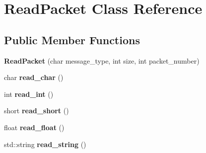 \hypertarget{class_read_packet}{\section{Read\-Packet Class Reference}
\label{class_read_packet}
}
\subsection*{Public Member Functions}
\begin{DoxyCompactItemize}
\item 
\hypertarget{class_read_packet_a00a7b6a89da284df88ca3f8ab55fae2d}{{\bfseries Read\-Packet} (char message\-\_\-type, int size, int packet\-\_\-number)}\label{class_read_packet_a00a7b6a89da284df88ca3f8ab55fae2d}

\item 
\hypertarget{class_read_packet_a63753af52ef533c66b3be50872f3abd2}{char {\bfseries read\-\_\-char} ()}\label{class_read_packet_a63753af52ef533c66b3be50872f3abd2}

\item 
\hypertarget{class_read_packet_ad8d4bb0fe52c7660db0cd089fd2e5c4a}{int {\bfseries read\-\_\-int} ()}\label{class_read_packet_ad8d4bb0fe52c7660db0cd089fd2e5c4a}

\item 
\hypertarget{class_read_packet_a63f15fc734db95aaa4ab56938ff94baf}{short {\bfseries read\-\_\-short} ()}\label{class_read_packet_a63f15fc734db95aaa4ab56938ff94baf}

\item 
\hypertarget{class_read_packet_a7d91d8e037415dc26ec105175bc6de6a}{float {\bfseries read\-\_\-float} ()}\label{class_read_packet_a7d91d8e037415dc26ec105175bc6de6a}

\item 
\hypertarget{class_read_packet_ae69e582fd3c4408b44b686e2707fdee8}{std\-::string {\bfseries read\-\_\-string} ()}\label{class_read_packet_ae69e582fd3c4408b44b686e2707fdee8}

\end{DoxyCompactItemize}
